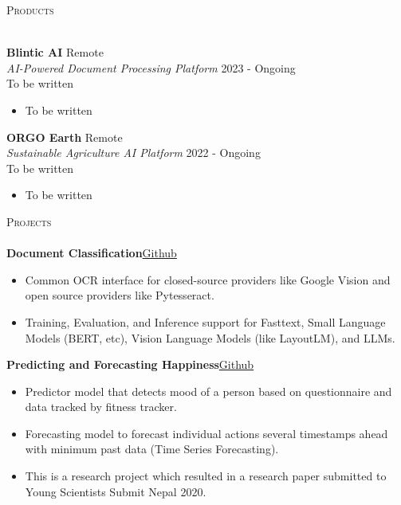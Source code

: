 \documentclass[a4paper]{article}
\newcommand{\lineunder} {
    \vspace*{-8pt} \\
    \hspace*{-18pt} \hrulefill \\
}
\newcommand{\header} [1] {
    {\hspace*{-18pt}\vspace*{6pt} \textsc{#1}}
    \vspace*{-6pt} \lineunder
}
\begin{document}
\header{Products}
\vspace{1mm}

\textbf{Blintic AI} \hfill Remote\\
\textit{AI-Powered Document Processing Platform} \hfill 2023 - Ongoing\\
\vspace{-1mm}
{To be written}
\begin{itemize} \itemsep 0pt
    \item To be written
\end{itemize}

\textbf{ORGO Earth} \hfill Remote\\
\textit{Sustainable Agriculture AI Platform} \hfill 2022 - Ongoing\\
\vspace{-1mm}
{To be written}
\begin{itemize} \itemsep 0pt
    \item To be written
\end{itemize}

\header{Projects}
{\textbf{Document Classification}}\hfill \href{https://github.com/amit-timalsina/document-classification}{Github}
\vspace{-1mm}
\begin{itemize} \itemsep 0pt
    \item Common OCR interface for closed-source providers like Google Vision and open source providers like Pytesseract.
    \item Training, Evaluation, and Inference support for Fasttext, Small Language Models (BERT, etc), Vision Language Models (like LayoutLM), and LLMs.
\end{itemize}
\vspace*{2mm}

{\textbf{Predicting and Forecasting Happiness}}\hfill \href{https://github.com/amit-timalsina/Predicting-and-Forecasting-Happiness}{Github}
\vspace{-1mm}
\begin{itemize} \itemsep 0pt
    \item Predictor model that detects mood of a person based on questionnaire and data tracked by fitness tracker.
    \item Forecasting model to forecast individual actions several timestamps ahead with minimum past data (Time Series Forecasting).
    \item This is a research project which resulted in a research paper submitted to Young Scientists Submit Nepal 2020.
\end{itemize}
\vspace*{2mm}
\end{document}
